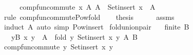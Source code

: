 \begin{isabellebody}
%
\isadelimproof
%
\endisadelimproof
%
\isatagproof
{}\isamarkupfalse%
\ {\isacharminus}{\kern0pt}\isanewline
\ \ \isamarkupfalse%
\ comp{\isacharunderscore}{\kern0pt}fun{\isacharunderscore}{\kern0pt}commute\ {\isachardoublequoteopen}{\isasymlambda}x\ A{\isachardot}{\kern0pt}\ A\ {\isasymunion}\ Set{\isachardot}{\kern0pt}insert\ x\ {\isacharbackquote}{\kern0pt}\ A{\isachardoublequoteclose}\isanewline
\ \ \ \ \isamarkupfalse%
\ {\isacharparenleft}{\kern0pt}rule\ comp{\isacharunderscore}{\kern0pt}fun{\isacharunderscore}{\kern0pt}commute{\isacharunderscore}{\kern0pt}Pow{\isacharunderscore}{\kern0pt}fold{\isacharparenright}{\kern0pt}\isanewline
\ \ \isamarkupfalse%
\ {\isacharquery}{\kern0pt}thesis\isanewline
\ \ \ \ \isamarkupfalse%
\ assms\ \isamarkupfalse%
\ {\isacharparenleft}{\kern0pt}induct\ A{\isacharparenright}{\kern0pt}\ {\isacharparenleft}{\kern0pt}auto\ simp{\isacharcolon}{\kern0pt}\ Pow{\isacharunderscore}{\kern0pt}insert{\isacharparenright}{\kern0pt}\isanewline
{}\isamarkupfalse%
%
\endisatagproof
{\isafoldproof}%
%
\isadelimproof
\isanewline
%
\endisadelimproof
\isanewline
{}\isamarkupfalse%
\ fold{\isacharunderscore}{\kern0pt}union{\isacharunderscore}{\kern0pt}pair{\isacharcolon}{\kern0pt}\isanewline
\ \ \ {\isachardoublequoteopen}finite\ B{\isachardoublequoteclose}\isanewline
\ \ \ {\isachardoublequoteopen}{\isacharparenleft}{\kern0pt}{\isasymUnion}y{\isasymin}B{\isachardot}{\kern0pt}\ {\isacharbraceleft}{\kern0pt}{\isacharparenleft}{\kern0pt}x{\isacharcomma}{\kern0pt}\ y{\isacharparenright}{\kern0pt}{\isacharbraceright}{\kern0pt}{\isacharparenright}{\kern0pt}\ {\isasymunion}\ A\ {\isacharequal}{\kern0pt}\ fold\ {\isacharparenleft}{\kern0pt}{\isasymlambda}y{\isachardot}{\kern0pt}\ Set{\isachardot}{\kern0pt}insert\ {\isacharparenleft}{\kern0pt}x{\isacharcomma}{\kern0pt}\ y{\isacharparenright}{\kern0pt}{\isacharparenright}{\kern0pt}\ A\ B{\isachardoublequoteclose}\isanewline
%
\isadelimproof
%
\endisadelimproof
%
\isatagproof
{}\isamarkupfalse%
\ {\isacharminus}{\kern0pt}\isanewline
\ \ \isamarkupfalse%
\ comp{\isacharunderscore}{\kern0pt}fun{\isacharunderscore}{\kern0pt}commute\ {\isachardoublequoteopen}{\isasymlambda}y{\isachardot}{\kern0pt}\ Set{\isachardot}{\kern0pt}insert\ {\isacharparenleft}{\kern0pt}x{\isacharcomma}{\kern0pt}\ y{\isacharparenright}{\kern0pt}{\isachardoublequoteclose}\isanewline
\ \ \ \ \isamarkupfalse%

\end{isabellebody}
